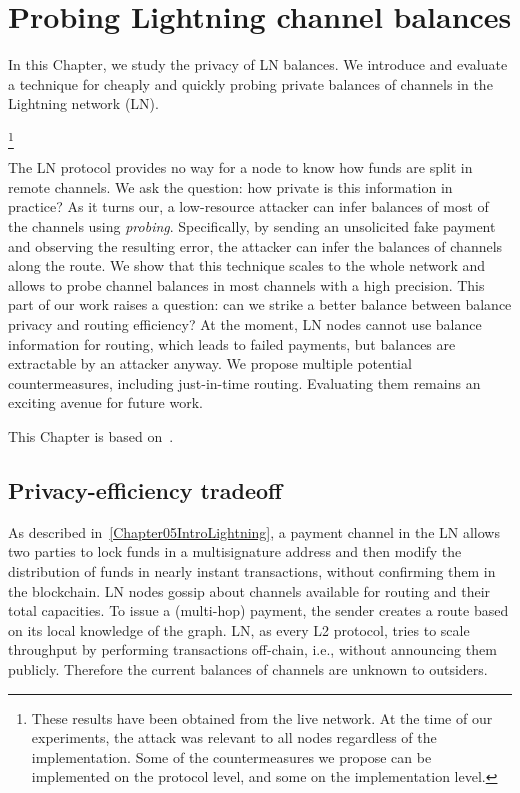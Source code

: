 \chapter{Probing Lightning channel balances}

\label{Chapter06LNprobing}

In this Chapter, we study the privacy of LN balances.
We introduce and evaluate a technique for cheaply and quickly probing private balances of channels in the Lightning network (LN).


\footnote{These results have been obtained from the live network. At the time of our experiments, the attack was relevant to all nodes regardless of the implementation. Some of the countermeasures we propose can be implemented on the protocol level, and some on the implementation level.}

The LN protocol provides no way for a node to know how funds are split in remote channels.
We ask the question: how private is this information in practice?
As it turns our, a low-resource attacker can infer balances of most of the channels using \textit{probing}.
Specifically, by sending an unsolicited fake payment and observing the resulting error, the attacker can infer the balances of channels along the route.
We show that this technique scales to the whole network and allows to probe channel balances in most channels with a high precision.
This part of our work raises a question: can we strike a better balance between balance privacy and routing efficiency?
At the moment, LN nodes cannot use balance information for routing, which leads to failed payments, but balances are extractable by an attacker anyway.
We propose multiple potential countermeasures, including just-in-time routing.
Evaluating them remains an exciting avenue for future work.

This Chapter is based on~\cite{Tikhomirov2020}.

\section{Privacy-efficiency tradeoff}

As described in~\ref{Chapter05IntroLightning}, a payment channel in the LN allows two parties to lock funds in a multisignature address and then modify the distribution of funds in nearly instant transactions, without confirming them in the blockchain.
LN nodes gossip about channels available for routing and their total capacities.
To issue a (multi-hop) payment, the sender creates a route based on its local knowledge of the graph.
LN, as every L2 protocol, tries to scale throughput by performing transactions off-chain, i.e., without announcing them publicly.
Therefore the current balances of channels are unknown to outsiders.


